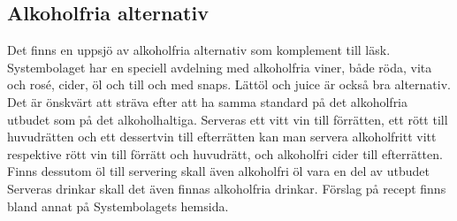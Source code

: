 \documentclass[]{dsekprotokoll}
\begin{document}
\subsection{Alkoholfria alternativ}
Det finns en uppsjö av alkoholfria alternativ som komplement till läsk. Systembolaget har en speciell avdelning med alkoholfria viner, både röda, vita och rosé, cider, öl och till och med snaps. Lättöl och juice är också bra alternativ. Det är önskvärt att sträva efter att ha samma standard på det alkoholfria utbudet som på det alkoholhaltiga. Serveras ett vitt vin till förrätten, ett rött till huvudrätten och ett dessertvin till efterrätten kan man servera alkoholfritt vitt respektive rött vin till förrätt och huvudrätt, och alkoholfri cider till efterrätten. Finns dessutom öl till servering skall även alkoholfri öl vara en del av utbudet
Serveras drinkar skall det även finnas alkoholfria drinkar. Förslag på recept finns bland annat
på Systembolagets hemsida.
\end{document}

